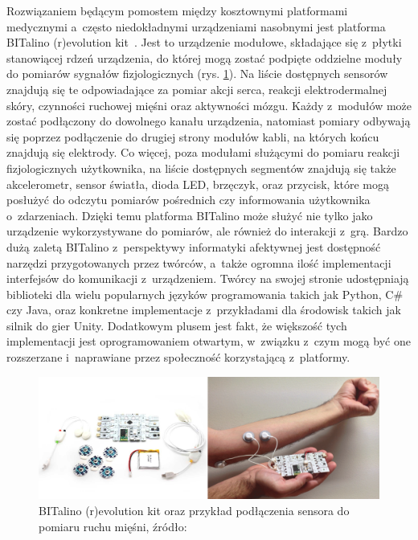 Rozwiązaniem będącym pomostem między kosztownymi platformami medycznymi a~często niedokładnymi urządzeniami nasobnymi jest platforma BITalino (r)evolution kit~\cite{bitalino_documentation}. Jest to urządzenie modułowe, składające się z~płytki stanowiącej rdzeń urządzenia, do której mogą zostać podpięte oddzielne moduły do pomiarów sygnałów fizjologicznych (rys. \ref{fig:bitalino}). Na liście dostępnych sensorów znajdują się te odpowiadające za pomiar akcji serca, reakcji elektrodermalnej skóry, czynności ruchowej mięśni oraz aktywności mózgu. Każdy z~modułów może zostać podłączony do dowolnego kanału urządzenia, natomiast pomiary odbywają się poprzez podłączenie do drugiej strony modułów kabli, na których końcu znajdują się elektrody. Co więcej, poza modułami służącymi do pomiaru reakcji fizjologicznych użytkownika, na liście dostępnych segmentów znajdują się także akcelerometr, sensor światła, dioda LED, brzęczyk, oraz przycisk, które mogą posłużyć do odczytu pomiarów pośrednich czy informowania użytkownika o~zdarzeniach. Dzięki temu platforma BITalino może służyć nie tylko jako urządzenie wykorzystywane do pomiarów, ale również do interakcji z~grą. Bardzo dużą zaletą BITalino z~perspektywy informatyki afektywnej jest dostępność narzędzi przygotowanych przez twórców, a~także ogromna ilość implementacji interfejsów do komunikacji z~urządzeniem. Twórcy na swojej stronie udostępniają biblioteki dla wielu popularnych języków programowania takich jak Python, C\# czy Java, oraz konkretne implementacje z~przykładami dla środowisk takich jak silnik do gier Unity. Dodatkowym plusem jest fakt, że większość tych implementacji jest oprogramowaniem otwartym, w~związku z~czym mogą być one rozszerzane i~naprawiane przez społeczność korzystającą z~platformy.

\begin{figure}
	\centering
	\includegraphics[width=0.9\linewidth]{images/bitalino_emg.png}
	\caption{BITalino (r)evolution kit oraz przykład podłączenia sensora do pomiaru ruchu mięśni, źródło: \cite{neurobit_manual}}
	\label{fig:bitalino}
\end{figure}

